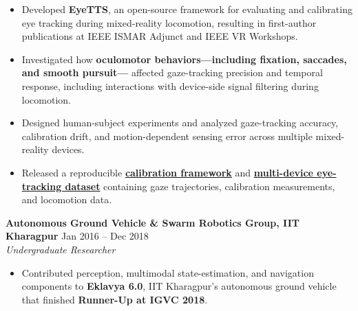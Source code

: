 \documentclass[10pt,letterpaper]{article}
\begin{document}
\begin{itemize}

    \item Developed \textbf{EyeTTS}, an open-source framework for evaluating and
    calibrating eye tracking during mixed-reality locomotion, resulting in
    first-author publications at IEEE ISMAR Adjunct and IEEE VR Workshops.

    \item Investigated how \textbf{oculomotor behaviors---including fixation, saccades, and smooth pursuit---}
    affected gaze-tracking precision and temporal response, including interactions with
    device-side signal filtering during locomotion.

    \item Designed human-subject experiments and analyzed gaze-tracking accuracy,
    calibration drift, and motion-dependent sensing error across multiple mixed-reality devices.

    \item Released a reproducible
    \href{https://github.com/satyam-aw/EyeTTS_Calibration-Framework}
    {\textbf{calibration framework}}
    and
    \href{https://github.com/satyam-aw/EyeTTS_Calibration-Framework/tree/main/participant-data}
    {\textbf{multi-device eye-tracking dataset}}
    containing gaze trajectories, calibration measurements, and locomotion data.

\end{itemize}

\medskip


\noindent
\textbf{Autonomous Ground Vehicle \& Swarm Robotics Group,
IIT Kharagpur}
\hfill Jan 2016 -- Dec 2018
\\
\textit{Undergraduate Researcher}

\begin{itemize}

    \item Contributed perception, multimodal state-estimation, and navigation components to
    \textbf{Eklavya 6.0}, IIT Kharagpur's autonomous ground vehicle that finished
    \textbf{Runner-Up at IGVC 2018}.

\end{itemize}

\end{document}
